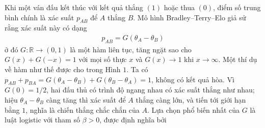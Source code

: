 \begin{multicols}{2}
	\vskip 0.02cm
	Khi một ván đấu kết thúc với kết quả thắng $(1)$ hoặc thua $(0)$, điểm số trung bình chính là xác suất $p_{AB}$ để $A$ thắng $B$. Mô hình Bradley--Terry--Elo giả sử rằng xác suất này có dạng
	\begin{align*}
		p_{AB} = G(\theta_A - \theta_B)\tag{$2$}
	\end{align*}
	ở đó $G: \mathbb R \rightarrow (0, 1)$ là một hàm liên tục, tăng ngặt sao cho $G(x) + G(-x) = 1$ với mọi số thực $x$ và $G(x) \rightarrow 1$ khi $x \rightarrow \infty$. Một thí dụ về hàm như thế được cho trong Hình $1$. Ta có $p_{AB} + p_{BA} = G(\theta_A - \theta_B) + G(\theta_B - \theta_A) = 1$, không có kết quả hòa. Vì $G(0) = 1/2$, hai đấu thủ có trình độ ngang nhau có xác suất thắng như nhau; hiệu $\theta_A - \theta_B$ càng tăng thì xác suất để $A$ thắng càng lớn, và tiến tới giới hạn bằng $1$, nghĩa là chiến thắng chắc chắn của $A$.
	Lựa chọn phổ biến nhất của $G$ là luật logistic với tham số $\beta > 0$, được định nghĩa bởi
	

\end{multicols}
